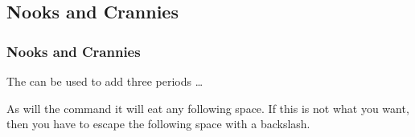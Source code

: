 {\subsection{Nooks and Crannies}
\begin{frame}[fragile]
  \frametitle{Nooks and Crannies}
  \vspace{3mm}
  The  can be used to add three periods \ldots
  
  \vspace{5mm}
  As will the  command it will eat any following space. If this is not what you want, then you have to escape the following space with a backslash.
\end{frame}

}


